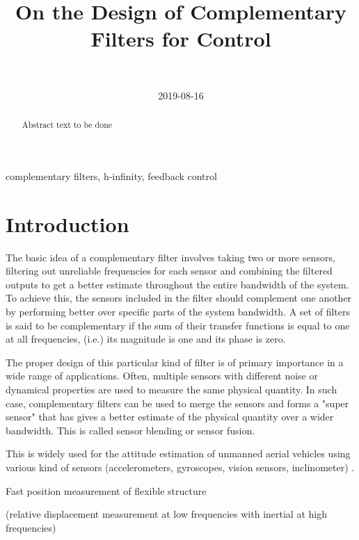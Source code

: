 \documentclass[9pt, technote, a4paper]{ieeeconf}
\author{\IEEEauthorblockN{Dehaeze Thomas\IEEEauthorrefmark{*}, Vermat Mohit and Collette Christophe} \\ \IEEEauthorblockA{Precision Mechatronics Laboratory, ULB\\ Brussels, Belgium\\ Email: \IEEEauthorrefmark{*}dehaeze.thomas@gmail.com}}
\date{2019-08-16}
\title{On the Design of Complementary Filters for Control}
\begin{document}
\maketitle


\begin{abstract}
Abstract text to be done
\end{abstract}

\begin{IEEEkeywords}
complementary filters, h-infinity, feedback control
\end{IEEEkeywords}

\section{Introduction}
\label{sec:org1a92e6d}
  \label{sec:introduction}
The basic idea of a complementary filter involves taking two or more sensors, filtering out unreliable frequencies for each sensor and combining the filtered outputs to get a better estimate throughout the entire bandwidth of the system.
To achieve this, the sensors included in the filter should complement one another by performing better over specific parts of the system bandwidth.
A set of filters is said to be complementary if the sum of their transfer functions is equal to one at all frequencies, (i.e.) its magnitude is one and its phase is zero.

The proper design of this particular kind of filter is of primary importance in a wide range of applications.
Often, multiple sensors with different noise or dynamical properties are used to measure the same physical quantity.
In such case, complementary filters can be used to merge the sensors and forms a "super sensor" that has gives a better estimate of the physical quantity over a wider bandwidth.
This is called sensor blending or sensor fusion.

This is widely used for the attitude estimation of unmanned aerial vehicles using various kind of sensors (accelerometers, gyroscopes, vision sensors, inclinometer) \cite{zimmermann92_high_bandw_orien_measur_contr,corke04_inert_visual_sensin_system_small_auton_helic,min15_compl_filter_desig_angle_estim}.

\cite{shaw90_bandw_enhan_posit_measur_using_measur_accel} Fast position measurement of flexible structure

\cite{matichard15_seism_isolat_advan_ligo} (relative displacement measurement at low frequencies with inertial at high frequencies)
\end{document}
